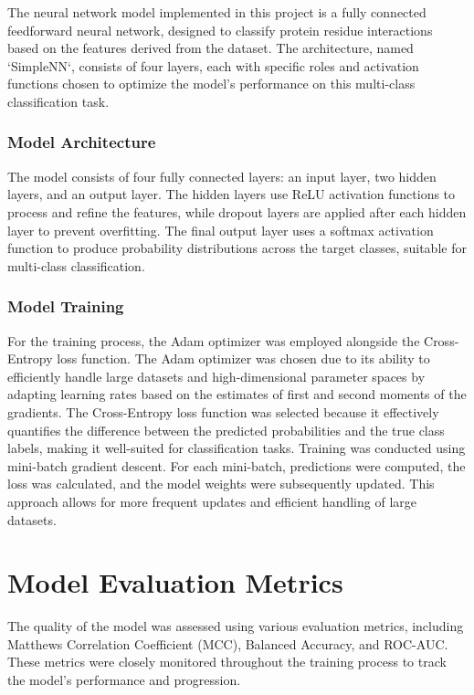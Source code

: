 \documentclass[10pt,twocolumn,letterpaper]{article}
\begin{document}
The neural network model implemented in this project is a fully connected feedforward neural network, designed to classify protein residue interactions based on the features derived from the dataset. The architecture, named `SimpleNN`, consists of four layers, each with specific roles and activation functions chosen to optimize the model's performance on this multi-class classification task.

\subsubsection{Model Architecture}

The model consists of four fully connected layers: an input layer, two hidden layers, and an output layer. The hidden layers use ReLU activation functions to process and refine the features, while dropout layers are applied after each hidden layer to prevent overfitting. The final output layer uses a softmax activation function to produce probability distributions across the target classes, suitable for multi-class classification.

\subsubsection{Model Training}

For the training process, the Adam optimizer was employed alongside the Cross-Entropy loss function. 
The Adam optimizer was chosen due to its ability to efficiently handle large datasets and high-dimensional parameter spaces by adapting learning rates based on the estimates of first and second moments of the gradients. 
The Cross-Entropy loss function was selected because it effectively quantifies the difference between the predicted probabilities and the true class labels, making it well-suited for classification tasks.
Training was conducted using mini-batch gradient descent. 
For each mini-batch, predictions were computed, the loss was calculated, and the model weights were subsequently updated. This approach allows for more frequent updates and efficient handling of large datasets.

\section{Model Evaluation Metrics}

The quality of the model was assessed using various evaluation metrics, including Matthews Correlation Coefficient (MCC), Balanced Accuracy, and ROC-AUC. These metrics were closely monitored throughout the training process to track the model's performance and progression.
\end{document}
